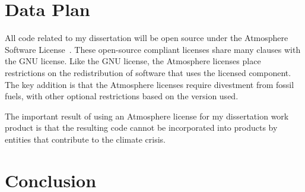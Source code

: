 \documentclass{article}
\begin{document}
\section{Data Plan}
\label{Sec:DataPlan}
All code related to my dissertation will be open source under the Atmosphere Software License~\cite{atmospherelicense}. 
These open-source compliant licenses share many clauses with the GNU license. 
Like the GNU license, the Atmosphere licenses place restrictions on the redistribution of software that uses the licensed component.
The key addition is that the Atmosphere licenses require divestment from fossil fuels, with other optional restrictions based on the version used. 

The important result of using an Atmosphere license for my dissertation work product is that the resulting code cannot be incorporated into products by entities that contribute to the climate crisis.
\section{Conclusion}




\end{document}
